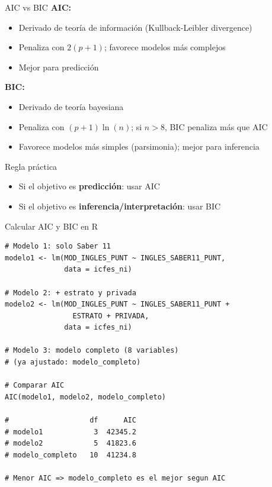 \documentclass[aspectratio=169, 11pt]{beamer}
\begin{document}
\begin{frame}{AIC vs BIC}
\textbf{AIC:}
\begin{itemize}
  \item Derivado de teor\'ia de informaci\'on (Kullback-Leibler divergence)
  \item Penaliza con $2(p+1)$; favorece modelos m\'as complejos
  \item Mejor para predicci\'on
\end{itemize}

\vspace{0.1cm}
\textbf{BIC:}
\begin{itemize}
  \item Derivado de teor\'ia bayesiana
  \item Penaliza con $(p+1) \ln(n)$; si $n > 8$, BIC penaliza m\'as que AIC
  \item Favorece modelos m\'as simples (parsimonia); mejor para inferencia
\end{itemize}

\vspace{0.2cm}
\begin{exampleblock}{Regla pr\'actica}
\begin{itemize}
  \item Si el objetivo es \textbf{predicci\'on}: usar AIC
  \item Si el objetivo es \textbf{inferencia/interpretaci\'on}: usar BIC
\end{itemize}
\end{exampleblock}
\end{frame}

\begin{frame}[fragile]{Calcular AIC y BIC en R}
\begin{lstlisting}[basicstyle=\ttfamily\scriptsize]
# Modelo 1: solo Saber 11
modelo1 <- lm(MOD_INGLES_PUNT ~ INGLES_SABER11_PUNT,
              data = icfes_ni)

# Modelo 2: + estrato y privada
modelo2 <- lm(MOD_INGLES_PUNT ~ INGLES_SABER11_PUNT +
                ESTRATO + PRIVADA,
              data = icfes_ni)

# Modelo 3: modelo completo (8 variables)
# (ya ajustado: modelo_completo)

# Comparar AIC
AIC(modelo1, modelo2, modelo_completo)

#                   df      AIC
# modelo1            3  42345.2
# modelo2            5  41823.6
# modelo_completo   10  41234.8

# Menor AIC => modelo_completo es el mejor segun AIC
\end{lstlisting}
\end{frame}
\end{document}
